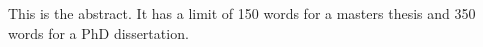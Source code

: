 

This is the abstract.  It has a limit of 150 words for a masters thesis and 350 words for a PhD dissertation.

